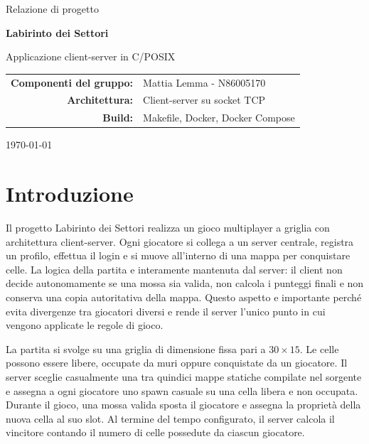 \documentclass[11pt,a4paper]{article}
\newcommand{\projectname}{Labirinto dei Settori}
\newcommand{\groupmembers}{Mattia Lemma - N86005170}
\begin{document}
\begin{titlepage}
  \centering
  \vspace*{1.5cm}
  {\Large Relazione di progetto\par}
  \vspace{1.2cm}
  {\Huge\bfseries \projectname\par}
  \vspace{0.5cm}
  {\Large Applicazione client-server in C/POSIX\par}
  \vfill
  \begin{tabular}{rl}
    \textbf{Componenti del gruppo:} & \groupmembers \\
    \textbf{Architettura:} & Client-server su socket TCP \\
    \textbf{Build:} & Makefile, Docker, Docker Compose \\
  \end{tabular}
  \vfill
  {\large \today\par}
\end{titlepage}

\tableofcontents
\newpage

\section{Introduzione}

Il progetto \projectname{} realizza un gioco multiplayer a griglia con architettura client-server. Ogni giocatore si collega a un server centrale, registra un profilo, effettua il login e si muove all'interno di una mappa per conquistare celle. La logica della partita e interamente mantenuta dal server: il client non decide autonomamente se una mossa sia valida, non calcola i punteggi finali e non conserva una copia autoritativa della mappa. Questo aspetto e importante perché evita divergenze tra giocatori diversi e rende il server l'unico punto in cui vengono applicate le regole di gioco.

La partita si svolge su una griglia di dimensione fissa pari a \(30 \times 15\). Le celle possono essere libere, occupate da muri oppure conquistate da un giocatore. Il server sceglie casualmente una tra quindici mappe statiche compilate nel sorgente e assegna a ogni giocatore uno spawn casuale su una cella libera e non occupata. Durante il gioco, una mossa valida sposta il giocatore e assegna la proprietà della nuova cella al suo slot. Al termine del tempo configurato, il server calcola il vincitore contando il numero di celle possedute da ciascun giocatore.
\end{document}
